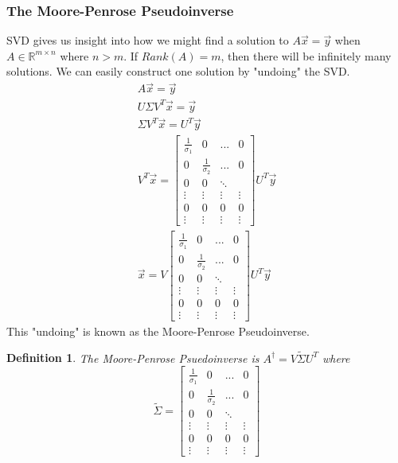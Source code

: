 \documentclass{article}
\newtheorem{definition}{Definition}
\begin{document}
\subsubsection{The Moore-Penrose Pseudoinverse}
SVD gives us insight into how we might find a solution to $A\vec{x}=\vec{y}$ when $A\in \mathbb{R}^{m\times n}$
where $n > m$. If $Rank(A)=m$, then there will be infinitely many solutions. We can easily construct one solution by "undoing" the SVD.
\[
    \begin{array}{c}
        A\vec{x}=\vec{y}\\
        U\Sigma V^T\vec{x} = \vec{y}\\
        \Sigma V^T \vec{x} = U^T\vec{y}\\
        V^T\vec{x} = \left[
            \begin{array}{cccc}
                \frac{1}{\sigma_1} & 0 & ... & 0\\
                0 & \frac{1}{\sigma_2} & ... & 0\\
                0 & 0 & \ddots & \\
                \vdots & \vdots & \vdots & \vdots\\
                0 & 0 & 0 & 0\\
                \vdots & \vdots & \vdots & \vdots
            \end{array}
            \right]U^T \vec{y}\\
        \vec{x} = V \left[
            \begin{array}{cccc}
                \frac{1}{\sigma_1} & 0 & ... & 0\\
                0 & \frac{1}{\sigma_2} & ... & 0\\
                0 & 0 & \ddots & \\
                \vdots & \vdots & \vdots & \vdots\\
                0 & 0 & 0 & 0\\
                \vdots & \vdots & \vdots & \vdots
            \end{array}
            \right]U^T \vec{y}
    \end{array}
\]
This "undoing" is known as the Moore-Penrose Pseudoinverse.
\begin{definition}
    The Moore-Penrose Psuedoinverse is $A^\dagger = V\tilde{\Sigma}U^T$ where
    \[
        \tilde{\Sigma} = \left[
            \begin{array}{cccc}
                \frac{1}{\sigma_1} & 0 & ... & 0\\
                0 & \frac{1}{\sigma_2} & ... & 0\\
                0 & 0 & \ddots & \\
                \vdots & \vdots & \vdots & \vdots\\
                0 & 0 & 0 & 0\\
                \vdots & \vdots & \vdots & \vdots
            \end{array}
            \right]
    \]
\end{definition}
\end{document}

